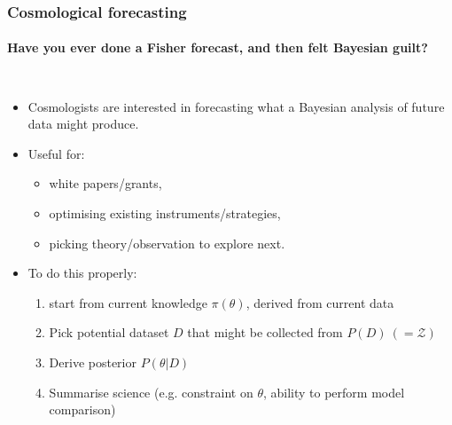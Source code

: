 \documentclass[aspectratio=169]{beamer}
\begin{document}
\begin{frame}
\begin{columns}
    \end{columns}


\end{frame}


\begin{frame}
    \frametitle{Cosmological forecasting}
    \framesubtitle{Have you ever done a Fisher forecast, and then felt Bayesian guilt?}
    \vspace{-20pt}
    \begin{columns}[t]
        \begin{itemize}
            \item Cosmologists are interested in forecasting what a Bayesian analysis of future data might produce.
            \item Useful for:
                \begin{itemize}
                    \item white papers/grants,
                    \item optimising existing instruments/strategies,
                    \item picking theory/observation to explore next.
                \end{itemize}
            \item To do this properly:
                \begin{enumerate}
                    \item start from current knowledge $\pi(\theta)$, derived from current data
                    \item Pick potential dataset $D$ that might be collected from $P(D)\: (=\mathcal{Z})$
                    \item Derive posterior $P(\theta|D)$
                    \item Summarise science (e.g. constraint on $\theta$, ability to perform model comparison)
                \end{enumerate}
        \end{itemize}


\end{columns}
\end{frame}
\end{document}
